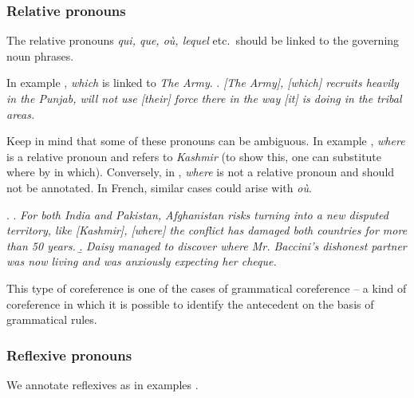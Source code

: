 \documentclass[a4paper]{article}
\begin{document}
\subsubsection{Relative pronouns}

The relative pronouns \textsl{qui, que, où, lequel} etc.\ should be linked to the
governing noun phrases.

In example \Next, {\sl which} is linked to \textsl{\sl The Army}.
\ex.
\textsl{[The Army], [which] recruits heavily in the Punjab, will not use [their] force there in the way [it] is doing in the tribal areas.}

Keep in mind that some of these pronouns can be ambiguous. In example \Next[a],
{\sl where} is a relative pronoun and refers to {\sl Kashmir} (to show this, one
can substitute where by in which). Conversely, in \Next[b], {\sl where} is not a
relative pronoun and should not be annotated. In French, similar cases could
arise with \textsl{où}.

\ex.
\a. {\sl For both India and Pakistan, Afghanistan risks turning into a new disputed
territory, like [Kashmir], [where] the conflict has damaged both countries for more than 50 years.}
\b. {\sl Daisy managed to discover where Mr. Baccini’s dishonest partner was now living and was anxiously expecting her cheque.}

This type of coreference is one of the cases of grammatical coreference --  a
kind of coreference in which it is possible to identify the antecedent on the
basis of grammatical rules.

\subsubsection{Reflexive pronouns}
We annotate reflexives as in examples \Next.
\end{document}
